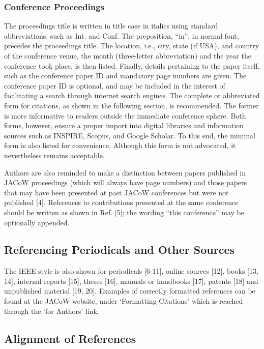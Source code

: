 \documentclass[letterpaper,  %
              ]{jacow-2_3}   %
\begin{document}
{{\subsubsection{Conference Proceedings} The proceedings title is written
in title case in italics using standard abbreviations,
such as Int. and Conf. The preposition, “in”, in normal
font, precedes the proceedings title. The location,
i.e., city, state (if USA), and country of the conference
venue, the month (three-letter abbreviation) and the year
the conference took place, is then listed. Finally, details
pertaining to the paper itself, such as the conference paper
ID and mandatory page numbers are given. The conference
paper ID is optional, and may be included in the
interest of facilitating a search through internet search
engines. The complete or abbreviated form for citations,
as shown in the following section, is recommended. The
former is more informative to readers outside the immediate
conference sphere. Both forms, however, ensure a
proper import into digital libraries and information
sources such as INSPIRE, Scopus, and Google Scholar.
To this end, the minimal form is also listed for convenience.
Although this form is not advocated, it nevertheless
remains acceptable.

Authors are also reminded to make a distinction between
papers published in JACoW proceedings (which
will always have page numbers) and those papers that
may have been presented at past JACoW conferences but
were not published [4]. References to contributions presented
at the same conference should be written as shown
in Ref. [5]; the wording “this conference” may be optionally
appended.

\subsection{Referencing Periodicals and Other Sources}

The IEEE style is also shown for periodicals [6-11],
online sources [12], books [13, 14], internal reports [15],
theses [16], manuals or handbooks [17], patents [18] and
unpublished material [19, 20]. Examples of correctly
formatted references can be found at the JACoW website,
under ‘Formatting Citations’ which is reached through the
‘for Authors’ link.

\subsection{Alignment of References}

}}
\end{document}
